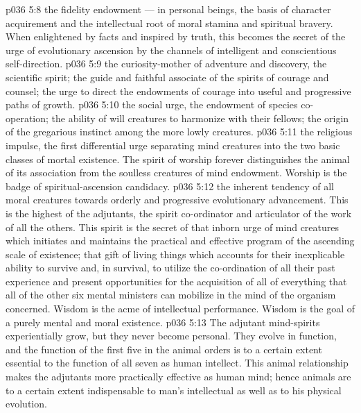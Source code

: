 \vs p036 5:8 \pc {}\bibnobreakspace {} the fidelity endowment --- in personal beings, the basis of character acquirement and the intellectual root of moral stamina and spiritual bravery. When enlightened by facts and inspired by truth, this becomes the secret of the urge of evolutionary ascension by the channels of intelligent and conscientious self\hyp{}direction.
\vs p036 5:9 \pc {}\bibnobreakspace {} the curiosity\hyp{}mother of adventure and discovery, the scientific spirit; the guide and faithful associate of the spirits of courage and counsel; the urge to direct the endowments of courage into useful and progressive paths of growth.
\vs p036 5:10 \pc {}\bibnobreakspace {} the social urge, the endowment of species co\hyp{}operation; the ability of will creatures to harmonize with their fellows; the origin of the gregarious instinct among the more lowly creatures.
\vs p036 5:11 \pc {}\bibnobreakspace {} the religious impulse, the first differential urge separating mind creatures into the two basic classes of mortal existence. The spirit of worship forever distinguishes the animal of its association from the soulless creatures of mind endowment. Worship is the badge of spiritual\hyp{}ascension candidacy.
\vs p036 5:12 \pc {}\bibnobreakspace {} the inherent tendency of all moral creatures towards orderly and progressive evolutionary advancement. This is the highest of the adjutants, the spirit co\hyp{}ordinator and articulator of the work of all the others. This spirit is the secret of that inborn urge of mind creatures which initiates and maintains the practical and effective program of the ascending scale of existence; that gift of living things which accounts for their inexplicable ability to survive and, in survival, to utilize the co\hyp{}ordination of all their past experience and present opportunities for the acquisition of all of everything that all of the other six mental ministers can mobilize in the mind of the organism concerned. Wisdom is the acme of intellectual performance. Wisdom is the goal of a purely mental and moral existence.
\vs p036 5:13 \pc The adjutant mind\hyp{}spirits experientially grow, but they never become personal. They evolve in function, and the function of the first five in the animal orders is to a certain extent essential to the function of all seven as human intellect. This animal relationship makes the adjutants more practically effective as human mind; hence animals are to a certain extent indispensable to man’s intellectual as well as to his physical evolution.
